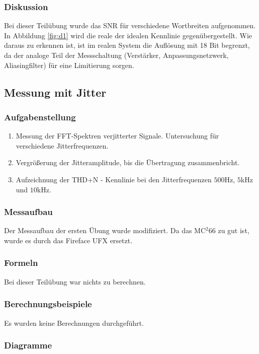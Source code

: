 \subsubsection{Diskussion}
Bei dieser Teilübung wurde das SNR für verschiedene Wortbreiten aufgenommen. In Abbildung \ref{fig:d1} wird die reale der idealen Kennlinie gegenübergestellt. Wie daraus zu erkennen ist, ist im realen System die Auflösung mit 18 Bit begrenzt, da der analoge Teil der Messschaltung (Verstärker, Anpassungsnetzwerk, Aliasingfilter) für eine Limitierung sorgen.
\pagebreak


\subsection{Messung mit Jitter}
\subsubsection{Aufgabenstellung}
\begin{enumerate}
\item Messung der FFT-Spektren verjitterter Signale. Untersuchung für verschiedene Jitterfrequenzen.
\item Vergrößerung der Jitteramplitude, bis die Übertragung zusammenbricht.
\item Aufzeichnung der THD+N - Kennlinie bei den Jitterfrequenzen $500$Hz, $5$kHz und $10$kHz. 
\end{enumerate}


\subsubsection{Messaufbau}
Der Messaufbau der ersten Übung wurde modifiziert. Da das MC$^2$66 zu gut ist, wurde es durch das Fireface UFX ersetzt.

\subsubsection{Formeln}
Bei dieser Teilübung war nichts zu berechnen.
\subsubsection{Berechnungsbeispiele}
Es wurden keine Berechnungen durchgeführt.

\subsubsection{Diagramme}


